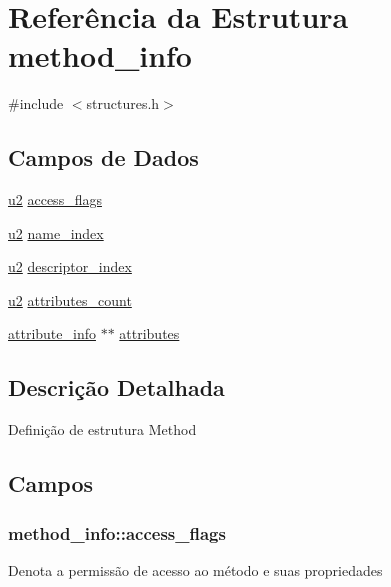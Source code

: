 \hypertarget{structmethod__info}{}\section{Referência da Estrutura method\+\_\+info}
\label{structmethod__info}


{\ttfamily \#include $<$structures.\+h$>$}

\subsection*{Campos de Dados}
\begin{DoxyCompactItemize}
\item 
\hyperlink{lista__operandos_8h_a732cde1300aafb73b0ea6c2558a7a54f}{u2} \hyperlink{structmethod__info_a3b657027a141cdbc94ded28607c98be5}{access\+\_\+flags}
\item 
\hyperlink{lista__operandos_8h_a732cde1300aafb73b0ea6c2558a7a54f}{u2} \hyperlink{structmethod__info_ab91d62d0658b77bba83f6bb685e3bbb9}{name\+\_\+index}
\item 
\hyperlink{lista__operandos_8h_a732cde1300aafb73b0ea6c2558a7a54f}{u2} \hyperlink{structmethod__info_a7713103e0c8d060630ad62774fb9be37}{descriptor\+\_\+index}
\item 
\hyperlink{lista__operandos_8h_a732cde1300aafb73b0ea6c2558a7a54f}{u2} \hyperlink{structmethod__info_ad9e5e1e2fc850806addadd6deab8565d}{attributes\+\_\+count}
\item 
\hyperlink{structattribute__info}{attribute\+\_\+info} $\ast$$\ast$ \hyperlink{structmethod__info_ab6e323f51c4f05e92c09e3ac5e7e07dc}{attributes}
\end{DoxyCompactItemize}


\subsection{Descrição Detalhada}
Definição de estrutura Method 

\subsection{Campos}
\subsubsection[{\texorpdfstring{access\+\_\+flags}{access_flags}}]{ method\+\_\+info\+::access\+\_\+flags}\hypertarget{structmethod__info_a3b657027a141cdbc94ded28607c98be5}{}\label{structmethod__info_a3b657027a141cdbc94ded28607c98be5}
Denota a permissão de acesso ao método e suas propriedades 
